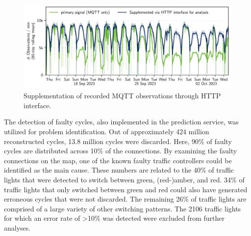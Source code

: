 \begin{figure}[t]
    \centering
    \includegraphics[width=\linewidth]{images/adaptiveness-mqtt-http.pdf}
    \caption{Supplementation of recorded MQTT observations through HTTP interface.}\label{fig:adaptiveness-mqtt-http}
\end{figure}


The detection of faulty cycles, also implemented in the prediction service, was utilized for problem identification. Out of approximately 424 million reconstructed cycles, 13.8 million cycles were discarded. Here, 90\% of faulty cycles are distributed across 10\% of the connections. By examining the faulty connections on the map, one of the known faulty traffic controllers could be identified as the main cause. These numbers are related to the 40\% of traffic lights that were detected to switch between green, (red-)amber, and red. 34\% of traffic lights that only switched between green and red could also have generated erroneous cycles that were not discarded. The remaining 26\% of traffic lights are comprised of a large variety of other switching patterns. The 2106 traffic lights for which an error rate of >10\% was detected were excluded from further analyses.

